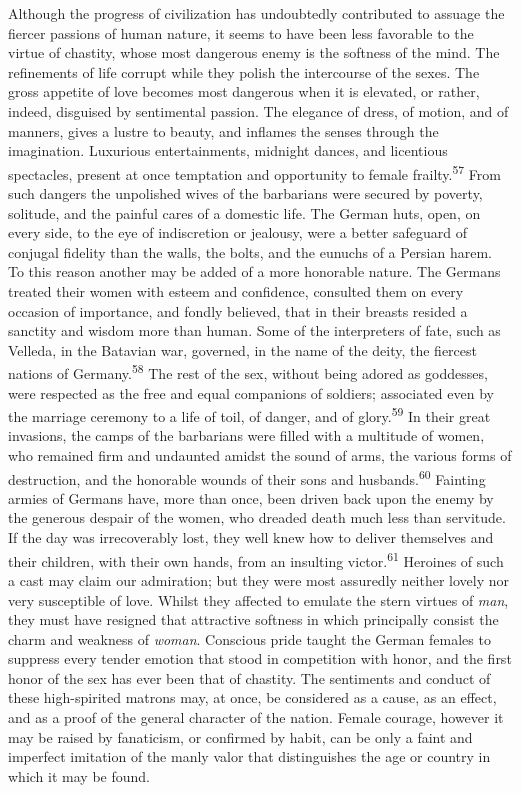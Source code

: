 Although the progress of civilization has undoubtedly contributed
to assuage the fiercer passions of human nature, it seems to have
been less favorable to the virtue of chastity, whose most
dangerous enemy is the softness of the mind. The refinements of
life corrupt while they polish the intercourse of the sexes. The
gross appetite of love becomes most dangerous when it is
elevated, or rather, indeed, disguised by sentimental passion.
The elegance of dress, of motion, and of manners, gives a lustre
to beauty, and inflames the senses through the imagination.
Luxurious entertainments, midnight dances, and licentious
spectacles, present at once temptation and opportunity to female
frailty.\textsuperscript{57} From such dangers the unpolished wives of the
barbarians were secured by poverty, solitude, and the painful
cares of a domestic life. The German huts, open, on every side,
to the eye of indiscretion or jealousy, were a better safeguard
of conjugal fidelity than the walls, the bolts, and the eunuchs
of a Persian harem. To this reason another may be added of a more
honorable nature. The Germans treated their women with esteem and
confidence, consulted them on every occasion of importance, and
fondly believed, that in their breasts resided a sanctity and
wisdom more than human. Some of the interpreters of fate, such as
Velleda, in the Batavian war, governed, in the name of the deity,
the fiercest nations of Germany.\textsuperscript{58} The rest of the sex, without
being adored as goddesses, were respected as the free and equal
companions of soldiers; associated even by the marriage ceremony
to a life of toil, of danger, and of glory.\textsuperscript{59} In their great
invasions, the camps of the barbarians were filled with a
multitude of women, who remained firm and undaunted amidst the
sound of arms, the various forms of destruction, and the
honorable wounds of their sons and husbands.\textsuperscript{60} Fainting armies
of Germans have, more than once, been driven back upon the enemy
by the generous despair of the women, who dreaded death much less
than servitude. If the day was irrecoverably lost, they well knew
how to deliver themselves and their children, with their own
hands, from an insulting victor.\textsuperscript{61} Heroines of such a cast may
claim our admiration; but they were most assuredly neither lovely
nor very susceptible of love. Whilst they affected to emulate the
stern virtues of \textit{man}, they must have resigned that attractive
softness in which principally consist the charm and weakness of
\textit{woman}. Conscious pride taught the German females to suppress
every tender emotion that stood in competition with honor, and
the first honor of the sex has ever been that of chastity. The
sentiments and conduct of these high-spirited matrons may, at
once, be considered as a cause, as an effect, and as a proof of
the general character of the nation. Female courage, however it
may be raised by fanaticism, or confirmed by habit, can be only a
faint and imperfect imitation of the manly valor that
distinguishes the age or country in which it may be found.

